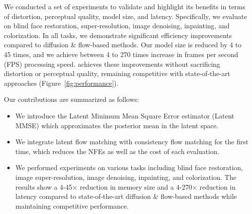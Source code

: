 We conducted a set of experiments to validate \name and highlight its benefits in terms of distortion, perceptual quality, model size, and latency. Specifically, we evaluate \name on blind face restoration, super-resolution, image denoising, inpainting, and colorization. In all tasks, we demonstrate significant efficiency improvements compared to diffusion \& flow-based methods. Our model size is reduced by 4 to 45 times, and we achieve between 4 to 270 times increase in frames per second (FPS) processing speed. \name achieves these improvements without sacrificing distortion or perceptual quality, remaining competitive with state-of-the-art approaches (Figure~\ref{fig:performance}).


Our contributions are summarized as follows:
\begin{itemize}
    
    \item We introduce the Latent Minimum Mean Square Error estimator (Latent MMSE) which approximates the posterior mean in the latent space. 
    
    \item We integrate latent flow matching with consistency flow matching for the first time, which reduces the NFEs as well as the cost of each evaluation.

    \item We performed experiments on various tasks including blind face restoration, image super-resolution, image denoising, inpainting, and colorization. The results show a 4-45$\times$ reduction in memory size and a 4-270$\times$ reduction in latency compared to state-of-the-art diffusion \& flow-based methods while maintaining competitive performance.
        
\end{itemize}



